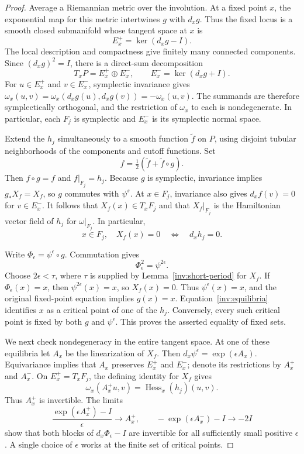 \begin{proof}
Average a Riemannian metric over the involution. At a fixed point $x$,
the exponential map for this metric intertwines $g$ with $d_xg$.
Thus the fixed locus is a smooth closed submanifold whose tangent space
at $x$ is
\[
  E_x^+=\ker(d_xg-I).
\]
The local description and compactness give finitely many connected
components. Since $(d_xg)^2=I$, there is a direct-sum decomposition
\[
  T_xP=E_x^+\oplus E_x^- ,\qquad
  E_x^-=\ker(d_xg+I).
\]
For $u\in E_x^+$ and $v\in E_x^-$, symplectic invariance gives
$\omega_x(u,v)=\omega_x(d_xg(u),d_xg(v))=-\omega_x(u,v)$.
The summands are therefore symplectically orthogonal, and the restriction
of $\omega_x$ to each is nondegenerate. In particular, each $F_j$ is
symplectic and $E_x^-$ is its symplectic normal space.

Extend the $h_j$ simultaneously to a smooth function $\widetilde f$ on
$P$, using disjoint tubular neighborhoods of the components and cutoff
functions. Set
\[
  f=\tfrac12(\widetilde f+\widetilde f\circ g).
\]
Then $f\circ g=f$ and $f|_{F_j}=h_j$. Because $g$ is symplectic,
invariance implies $g_*X_f=X_f$, so $g$ commutes with $\psi^s$. At
$x\in F_j$, invariance also gives $d_xf(v)=0$ for $v\in E_x^-$.
It follows that $X_f(x)\in T_xF_j$ and that $X_f|_{F_j}$ is the
Hamiltonian vector field of $h_j$ for $\omega|_{F_j}$. In particular,
\begin{equation}\label{inv:equilibria}
  x\in F_j,\quad X_f(x)=0
  \quad\Longleftrightarrow\quad d_xh_j=0.
\end{equation}

Write $\Phi_\epsilon=\psi^\epsilon\circ g$. Commutation gives
\[
  \Phi_\epsilon^2=\psi^{2\epsilon}.
\]
Choose $2\epsilon<\tau$, where $\tau$ is supplied by
Lemma~\ref{inv:short-period} for $X_f$. If $\Phi_\epsilon(x)=x$, then
$\psi^{2\epsilon}(x)=x$, so $X_f(x)=0$. Thus $\psi^\epsilon(x)=x$,
and the original fixed-point equation implies $g(x)=x$.
Equation~\eqref{inv:equilibria} identifies $x$ as a critical point of
one of the $h_j$. Conversely, every such critical point is fixed by
both $g$ and $\psi^\epsilon$. This proves the asserted equality of fixed
sets.

We next check nondegeneracy in the entire tangent space. At one of these
equilibria let $A_x$ be the linearization of $X_f$. Then
$d_x\psi^\epsilon=\exp(\epsilon A_x)$. Equivariance implies that
$A_x$ preserves $E_x^+$ and $E_x^-$; denote its restrictions by
$A_x^+$ and $A_x^-$. On $E_x^+=T_xF_j$, the defining identity for
$X_f$ gives
\[
  \omega_x(A_x^+u,v)=\operatorname{Hess}_x(h_j)(u,v).
\]
Thus $A_x^+$ is invertible. The limits
\[
  \frac{\exp(\epsilon A_x^+)-I}{\epsilon}\longrightarrow A_x^+,
  \qquad
  -\exp(\epsilon A_x^-)-I\longrightarrow-2I
\]
show that both blocks of $d_x\Phi_\epsilon-I$ are invertible for all
sufficiently small positive $\epsilon$. A single choice of $\epsilon$
works at the finite set of critical points.


\end{proof}
